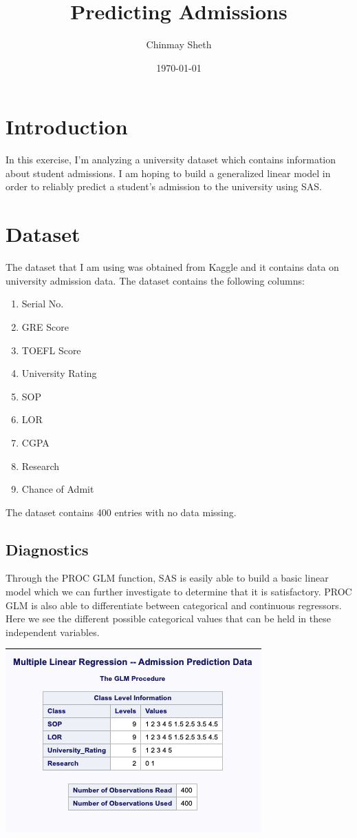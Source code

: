 \documentclass{article}
\title{Predicting Admissions}
\author{Chinmay Sheth}
\date\today
\begin{document}
\maketitle

\section*{Introduction}

In this exercise, I'm analyzing a university dataset which contains information about student admissions. I am hoping to build a generalized linear model in order to reliably predict a student's admission to the university using SAS.

\section*{Dataset}

The dataset that I am using was obtained from Kaggle and it contains data on university admission data. The dataset contains the following columns:

\begin{enumerate}

\item Serial No.
\item GRE Score
\item TOEFL Score
\item University Rating
\item SOP
\item LOR
\item CGPA
\item Research
\item Chance of Admit

\end{enumerate}


The dataset contains 400 entries with no data missing.

\subsection*{Diagnostics}

Through the PROC GLM function, SAS is easily able to build a basic linear model which we can further investigate to determine that it is satisfactory. PROC GLM is also able to differentiate between categorical and continuous regressors. Here we see the different possible categorical values that can be held in these independent variables.

\includegraphics[scale=1]{GLM_Procedure.png}
\end{document}

